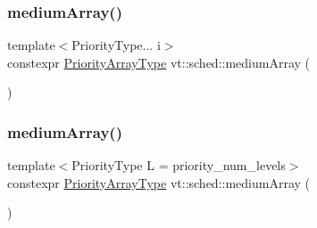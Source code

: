 \subsubsection{\texorpdfstring{medium\+Array()}{mediumArray()}\hspace{0.1cm}{\footnotesize\ttfamily [1/2]}}
{\footnotesize\ttfamily template$<$Priority\+Type... i$>$ \\
constexpr \hyperlink{namespacevt_1_1sched_a2dbd1daff26f79efbff3f418ad9b2a8b}{Priority\+Array\+Type} vt\+::sched\+::medium\+Array (\begin{DoxyParamCaption}\item[{std\+::integer\+\_\+sequence$<$ \hyperlink{namespacevt_a86bff9f556eb761b27fc8600d006ac04}{Priority\+Type}, i... $>$}]{ }\end{DoxyParamCaption})}

\mbox{\label{namespacevt_1_1sched_a3f4c11ddd24523a16b3f3606a4662014}} 
\subsubsection{\texorpdfstring{medium\+Array()}{mediumArray()}\hspace{0.1cm}{\footnotesize\ttfamily [2/2]}}
{\footnotesize\ttfamily template$<$Priority\+Type L = priority\+\_\+num\+\_\+levels$>$ \\
constexpr \hyperlink{namespacevt_1_1sched_a2dbd1daff26f79efbff3f418ad9b2a8b}{Priority\+Array\+Type} vt\+::sched\+::medium\+Array (\begin{DoxyParamCaption}{ }\end{DoxyParamCaption})}

